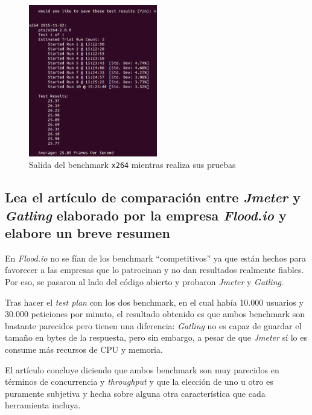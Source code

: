 \documentclass[10pt,a4paper,spanish]{article}
\numberwithin{equation}{section} %
\numberwithin{figure}{section} %
\numberwithin{table}{section} %
\begin{document}
\begin{figure}[!h]
\centering
\includegraphics[width=0.5\textwidth]{4_3}
\caption{Salida del benchmark \texttt{x264} mientras realiza sus pruebas}
\label{x264test}
\end{figure}

\setcounter{subsection}{2}
\subsection{Lea el artículo de comparación entre \textit{Jmeter} y \textit{Gatling} elaborado por la empresa \textit{Flood.io} y elabore un breve resumen}
En \textit{Flood.io} no se fían de los benchmark ``competitivos'' ya que están hechos para favorecer a las empresas que lo patrocinan y no dan resultados realmente fiables. Por eso, se pasaron al lado del código abierto y probaron \textit{Jmeter} y \textit{Gatling}.

Tras hacer el \textit{test plan} con los dos benchmark, en el cual había 10.000 usuarios y 30.000 peticiones por minuto, el resultado obtenido es que ambos benchmark son bastante parecidos pero tienen una diferencia: \textit{Gatling} no es capaz de guardar el tamaño en bytes de la respuesta, pero sin embargo, a pesar de que \textit{Jmeter} sí lo es consume más recursos de CPU y memoria.

El artículo concluye diciendo que ambos benchmark son muy parecidos en términos de concurrencia y \textit{throughput} y que la elección de uno u otro es puramente subjetiva y hecha sobre alguna otra característica que cada herramienta incluya.

\end{document}
